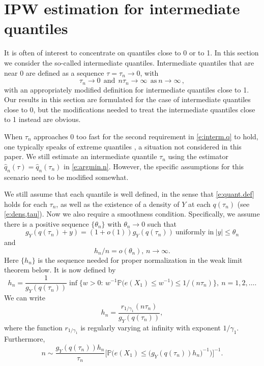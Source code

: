 \documentclass[12pt]{amsart}
\newcommand{\1}{\mathbbm{1}}
\newcommand{\0}{\mathbf{0}}
\theoremstyle{plain}
\theoremstyle{definition}
\newcommand{\bbP}{\mathbb{P}}
\begin{document}
 

 
 
 \section{IPW estimation for intermediate quantiles} \label{sec:intermediate}

 It is often of interest to concentrate on quantiles close to 0 or to 1. 
 In this section we consider the so-called intermediate quantiles. Intermediate quantiles that are near 0 are defined as a sequence $\tau=\tau_n\to 0$, with
 \begin{equation} \label{e:interm.q}
   \tau_n\to 0 \ \ \text{and}\ \  n\tau_n\to\infty \ \ \text{as} \ n\to\infty\,, 
 \end{equation}
 with an appropriately modified definition for intermediate quantiles close to 1. Our results in this section are formulated for the case of intermediate quantiles close to 0, but the modifications needed to treat the intermediate quantiles close to 1 instead are obvious. 

 When $\tau_n$ approaches 0 too fast for the second requirement in 
 \eqref{e:interm.q} to hold, one typically speaks of extreme quantiles \cite{wang:li:he2012,deuber:lo:engelke:maathuis2023}, a situation not considered in this paper. We still estimate an intermediate quantile $\tau_n$ using the estimator $\hat q_n(\tau) =\hat q_n(\tau_n)$
 in \eqref{e:argmin.n}.  However, the specific assumptions  for this scenario need to be modified somewhat. 
   
 
We still assume that each quantile is well defined, in the sense that
\eqref{e:quant.def} holds for each $\tau_n$, as well as the existence of a density of $Y$ at each $q(\tau_n)$ (see \eqref{e:dens,tau}).  Now we also require a smoothness condition.   Specifically, we assume there 
is a positive sequence $\{\theta_n\}$ with $\theta_n\to 0$ such that
%
\begin{equation} \label{e:theta.n}
g_Y(q(\tau_n)+y) = (1+o(1)) g_Y(q(\tau_n)) \ \text{uniformly in} \
|y|\leq\theta_n
\end{equation}
%
and  
%
\begin{equation} \label{e:hn.thetan}
  h_n/n=o(\theta_n), \, n\to\infty.
\end{equation}
%
Here $\{h_n\}$ is the  
sequence needed for proper normalization in the weak limit theorem below. It is now 
defined by
%
\begin{equation} \label{e:h_n.interm}
h_n=\frac{1}{g_Y(q(\tau_n))}\inf\bigl\{ w>0:\, w^{-1} \bbP\bigl( e(X_1)\leq w^{-1})\leq
1/(n\tau_n)\bigr\}, \ n=1,2,\ldots. 
\end{equation}
%
We can write
%
\begin{equation} \label{e:hn.rv}
  h_n=\frac{r_{1/\gamma_1}(n\tau_n)}{g_Y(q(\tau_n))},
\end{equation}
%
where the function $r_{1/\gamma_1}$ is regularly varying at infinity
with exponent $1/\gamma_1$. Furthermore, 
%
\begin{equation} \label{e:express.n}
n \sim \frac{g_Y(q(\tau_n))   h_n}{\tau_n} \bigl[ \bbP\bigl(e(X_1)\leq \bigl(
g_Y(q(\tau_n))   h_n\bigr)^{-1}\bigr)\bigr]^{-1}. \end{equation} 
\end{document}
